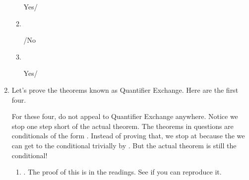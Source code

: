\begin{enumerate}
\begin{enumerate}
\begin{argumentN}[1]
\end{argumentN}
\dotfill Yes/

\item ~
  

\begin{argumentN}[1]



\end{argumentN}

\dotfill {}/No

\item  ~


\begin{argumentN}[1]




\end{argumentN}

\dotfill Yes/



\newpage



\end{enumerate}


 \item Let's prove the theorems known as Quantifier Exchange. Here are the first 
  four.

  For these four, do not appeal to Quantifier Exchange anywhere. Notice we stop 
  one step short of the actual theorem.  The theorems in questions are 
  conditionals of the form .  Instead of proving that, we 
  stop at  because the we can get to the conditional 
  trivially by \condI. But the actual theorem is still the conditional!



  \begin{enumerate}
 \setlength{\itemsep}{1em}
   \item {}. The proof of this is in the readings.  
	See if you can reproduce it.

	\opts{
\dotline
\dotline
\dotline
\dotline
\dotline
\dotline
\dotline
\dotline
\dotline

}
\end{enumerate}
\end{enumerate}
